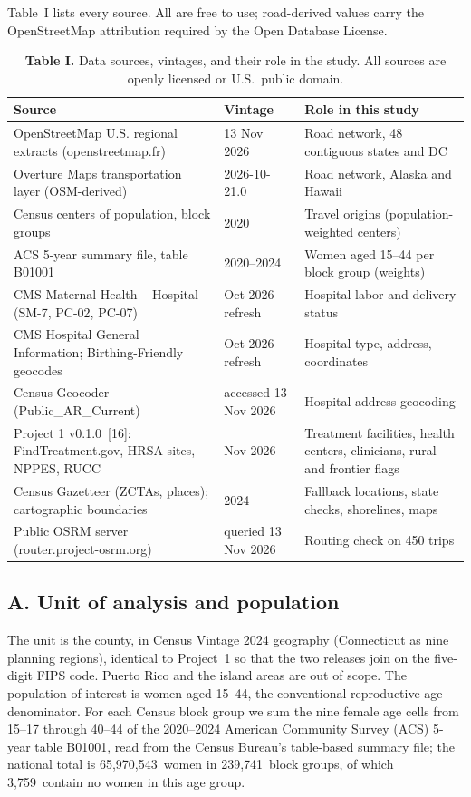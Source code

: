 \documentclass{article}
\begin{document}
Table~I lists every source. All are free to use; road-derived values carry the OpenStreetMap attribution required by the Open Database License.

\begin{table}
\centering\caption{\textbf{Table I.} Data sources, vintages, and their role in the study. All sources are openly licensed or U.S.\ public domain.}
\begin{tabular}{@{}p{}p{}p{}@{}}
\toprule
Source & Vintage & Role in this study \\
\midrule
OpenStreetMap U.S. regional extracts (openstreetmap.fr) & 13 Nov 2026 & Road network, 48 contiguous states and DC \\
Overture Maps transportation layer (OSM-derived) & 2026-10-21.0 & Road network, Alaska and Hawaii \\
Census centers of population, block groups & 2020 & Travel origins (population-weighted centers) \\
ACS 5-year summary file, table B01001 & 2020--2024 & Women aged 15--44 per block group (weights) \\
CMS Maternal Health -- Hospital (SM-7, PC-02, PC-07) & Oct 2026 refresh & Hospital labor and delivery status \\
CMS Hospital General Information; Birthing-Friendly geocodes & Oct 2026 refresh & Hospital type, address, coordinates \\
Census Geocoder (Public\_AR\_Current) & accessed 13 Nov 2026 & Hospital address geocoding \\
Project 1 v0.1.0~[16]: FindTreatment.gov, HRSA sites, NPPES, RUCC & Nov 2026 & Treatment facilities, health centers, clinicians, rural and frontier flags \\
Census Gazetteer (ZCTAs, places); cartographic boundaries & 2024 & Fallback locations, state checks, shorelines, maps \\
Public OSRM server (router.project-osrm.org) & queried 13 Nov 2026 & Routing check on 450 trips \\
\bottomrule
\end{tabular}

\end{table}

\subsection*{A. Unit of analysis and population}
The unit is the county, in Census Vintage 2024 geography (Connecticut as nine planning regions), identical to Project~1 so that the two releases join on the five-digit FIPS code. Puerto Rico and the island areas are out of scope. The population of interest is women aged 15--44, the conventional reproductive-age denominator. For each Census block group we sum the nine female age cells from 15--17 through 40--44 of the 2020--2024 American Community Survey (ACS) 5-year table B01001, read from the Census Bureau's table-based summary file; the national total is 65,970,543\ women in 239,741\ block groups, of which 3,759\ contain no women in this age group.
\end{document}
